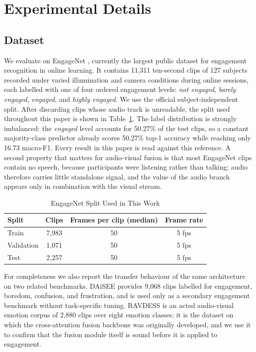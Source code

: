 \documentclass[journal]{IEEEtran}
\begin{document}
\section{Experimental Details}

\subsection{Dataset}

We evaluate on EngageNet \cite{singh2023engagenet}, currently the largest public dataset for engagement recognition in online learning. It contains 11,311 ten-second clips of 127 subjects recorded under varied illumination and camera conditions during online sessions, each labelled with one of four ordered engagement levels: \emph{not engaged}, \emph{barely engaged}, \emph{engaged}, and \emph{highly engaged}. We use the official subject-independent split. After discarding clips whose audio track is unreadable, the split used throughout this paper is shown in Table~\ref{tab_dataset}. The label distribution is strongly imbalanced: the \emph{engaged} level accounts for 50.27\% of the test clips, so a constant majority-class predictor already scores 50.27\% top-1 accuracy while reaching only 16.73 macro-F1. Every result in this paper is read against this reference. A second property that matters for audio-visual fusion is that most EngageNet clips contain no speech, because participants were listening rather than talking; audio therefore carries little standalone signal, and the value of the audio branch appears only in combination with the visual stream.

\begin{table}[!t]
\renewcommand{\arraystretch}{1.3}
\caption{EngageNet Split Used in This Work}
\label{tab_dataset}
\centering
\begin{tabular}{|l|c|c|c|}
\hline
Split & Clips & Frames per clip (median) & Frame rate\\
\hline
Train & 7,983 & 50 & 5 fps\\
Validation & 1,071 & 50 & 5 fps\\
Test & 2,257 & 50 & 5 fps\\
\hline
\end{tabular}
\end{table}

For completeness we also report the transfer behaviour of the same architecture on two related benchmarks. DAiSEE \cite{gupta2016daisee} provides 9,068 clips labelled for engagement, boredom, confusion, and frustration, and is used only as a secondary engagement benchmark without task-specific tuning. RAVDESS \cite{livingstone2018ravdess} is an acted audio-visual emotion corpus of 2,880 clips over eight emotion classes; it is the dataset on which the cross-attention fusion backbone was originally developed, and we use it to confirm that the fusion module itself is sound before it is applied to engagement.
\end{document}
